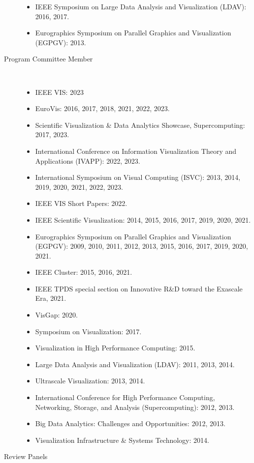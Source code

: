 \documentclass{article}
\begin{document}
\begin{description}
\begin{itemize}
  \item
    IEEE Symposium on Large Data Analysis and Visualization (LDAV): 2016, 2017.
  \item
    Eurographics Symposium on Parallel Graphics and Visualization (EGPGV): 2013.
  \end{itemize}
\item[Program Committee Member]~
  \begin{itemize}
  \item IEEE VIS: 2023
  \item
    EuroVis: 2016, 2017, 2018, 2021, 2022, 2023.
  \item
    Scientific Visualization \& Data Analytics Showcase, Supercomputing: 2017, 2023.
  \item
    International Conference on Information Visualization Theory and Applications (IVAPP): 2022, 2023. 
  \item
    International Symposium on Visual Computing (ISVC): 2013, 2014, 2019, 2020, 2021, 2022, 2023.
  \item
    IEEE VIS Short Papers: 2022.
  \item
    IEEE Scientific Visualization: 2014, 2015, 2016, 2017, 2019, 2020, 2021.
  \item
    Eurographics Symposium on Parallel Graphics and Visualization (EGPGV): 2009, 2010, 2011, 2012, 2013, 2015, 2016, 2017, 2019, 2020, 2021.
  \item
    IEEE Cluster: 2015, 2016, 2021.
  \item
    IEEE TPDS special section on Innovative R\&D toward the Exascale Era, 2021.
  \item
    VisGap: 2020.
  \item
    Symposium on Visualization: 2017.
  \item
    Visualization in High Performance Computing: 2015.
  \item
    Large Data Analysis and Visualization (LDAV): 2011, 2013, 2014.
  \item
    Ultrascale Visualization: 2013, 2014.
  \item
    International Conference for High Performance Computing, Networking, Storage, and Analysis (Supercomputing): 2012, 2013.
  \item
    Big Data Analytics: Challenges and Opportunities: 2012, 2013.
  \item
    Visualization Infrastructure \& Systems Technology: 2014.
  \end{itemize}
\item[Review Panels]~

\end{description}
\end{document}
